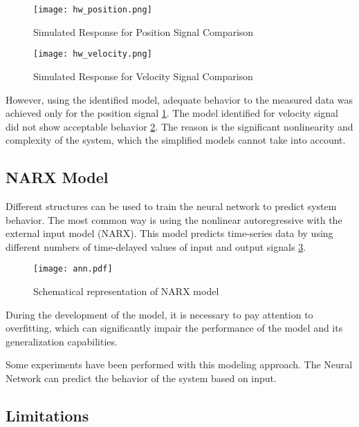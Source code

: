 \begin{figure}[h!]
    \centering
    \texttt{[image: hw\_position.png]}
    \caption{Simulated Response for Position Signal Comparison}
    \label{fig:hw_position}
\end{figure}

\begin{figure}[h!]
    \centering
    \texttt{[image: hw\_velocity.png]}
    \caption{Simulated Response for Velocity Signal Comparison}
    \label{fig:hw_velocity}
\end{figure}

However, using the identified model, adequate behavior to the measured data
was achieved only for the position signal \ref{fig:hw_position}. The model identified
for velocity signal did not show acceptable behavior \ref{fig:hw_velocity}.  The
reason is the significant nonlinearity and complexity of the system, which
the simplified models cannot take into account.



\newpage
\subsection{NARX Model}

Different structures can be used to train the neural network to predict
system behavior. The most common way is using the nonlinear autoregressive
with the external input model (NARX). This model predicts time-series data
by using different numbers of time-delayed values of input and output
signals \ref{fig:ann}.

\begin{figure}[h!]
    \centering
    \texttt{[image: ann.pdf]}
    \caption{Schematical representation of NARX model}
    \label{fig:ann}
\end{figure}


During the development of the model, it is necessary to pay attention to
overfitting, which can significantly impair the performance of the model
and its generalization capabilities.

Some experiments have been performed with this modeling approach. The
Neural Network can predict the behavior of the system based on input.

\subsection{Limitations}
